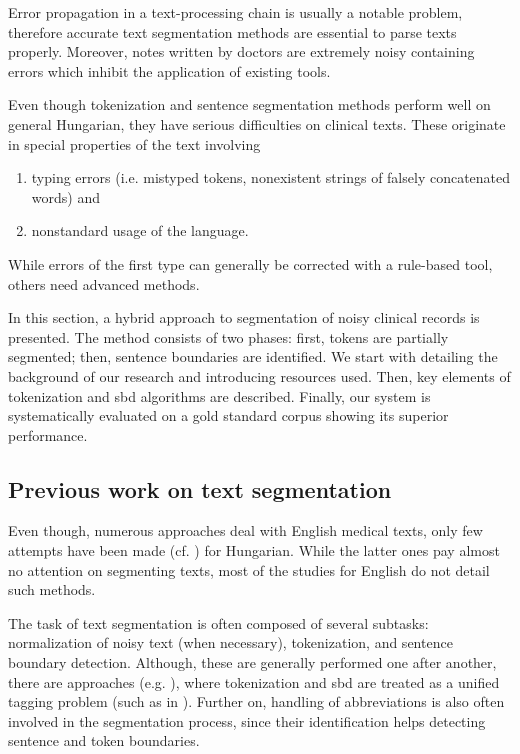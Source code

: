 Error propagation in a text-processing chain is usually a notable problem, therefore accurate text segmentation methods are essential to parse texts properly.
Moreover, notes written by doctors are extremely noisy containing errors which inhibit the application of existing tools.

Even though tokenization and sentence segmentation methods perform well on general Hungarian, they have serious difficulties on clinical texts.
These originate in special properties of the text involving
\begin{enumerate} %
 \item typing errors (i.e. mistyped tokens, nonexistent strings of falsely concatenated words) and
 \item nonstandard usage of the language.
\end{enumerate}
While errors of the first type can generally be corrected with a rule-based tool, others need advanced methods. 

In this section, a hybrid approach to segmentation of noisy clinical records is presented. 
The method consists of two phases: first, tokens are partially segmented; then, sentence boundaries are identified.
We start with detailing the background of our research and introducing resources used.
Then, key elements of tokenization and \gls{sbd} algorithms are described. 
Finally, our system is systematically evaluated on a gold standard corpus showing its superior performance.

\subsection{Previous work on text segmentation}

Even though, numerous approaches deal with English medical texts, only few attempts have been made (cf. \cite{Siklosi2012,Siklosi2013,Siklosi2013b}) for Hungarian. 
While the latter ones pay almost no attention on segmenting texts, most of the studies for English do not detail such methods. 

The task of text segmentation is often composed of several subtasks: normalization of noisy text (when necessary), tokenization, and sentence boundary detection.  
Although, these are generally performed one after another, there are approaches (e.g. \cite{zhu2007unified}), where tokenization and \acrshort{sbd} are treated as a unified tagging problem (such as in \cite{mikheev2000tagging}). 
Further on, handling of abbreviations is also often involved in the segmentation process, since their identification helps detecting sentence and token boundaries.

